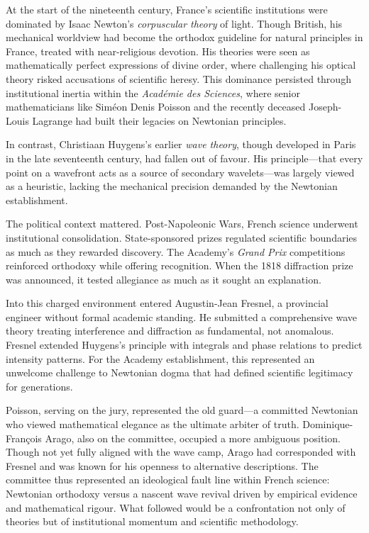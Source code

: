 \begin{historical}
At the start of the nineteenth century, France’s scientific institutions were dominated by Isaac Newton’s \emph{corpuscular theory} of light. Though British, his mechanical worldview had become the orthodox guideline for natural principles in France, treated with near-religious devotion. His theories were seen as mathematically perfect expressions of divine order, where challenging his optical theory risked accusations of scientific heresy. This dominance persisted through institutional inertia within the \emph{Académie des Sciences}, where senior mathematicians like Siméon Denis Poisson and the recently deceased Joseph-Louis Lagrange had built their legacies on Newtonian principles.

In contrast, Christiaan Huygens’s earlier \emph{wave theory}, though developed in Paris in the late seventeenth century, had fallen out of favour. His principle—that every point on a wavefront acts as a source of secondary wavelets—was largely viewed as a heuristic, lacking the mechanical precision demanded by the Newtonian establishment.

The political context mattered. Post-Napoleonic Wars, French science underwent institutional consolidation. State-sponsored prizes regulated scientific boundaries as much as they rewarded discovery. The Academy's \emph{Grand Prix} competitions reinforced orthodoxy while offering recognition. When the 1818 diffraction prize was announced, it tested allegiance as much as it sought an explanation.

Into this charged environment entered Augustin-Jean Fresnel, a provincial engineer without formal academic standing. He submitted a comprehensive wave theory treating interference and diffraction as fundamental, not anomalous. Fresnel extended Huygens’s principle with integrals and phase relations to predict intensity patterns. For the Academy establishment, this represented an unwelcome challenge to Newtonian dogma that had defined scientific legitimacy for generations.

Poisson, serving on the jury, represented the old guard—a committed Newtonian who viewed mathematical elegance as the ultimate arbiter of truth. Dominique-François Arago, also on the committee, occupied a more ambiguous position. Though not yet fully aligned with the wave camp, Arago had corresponded with Fresnel and was known for his openness to alternative descriptions. The committee thus represented an ideological fault line within French science: Newtonian orthodoxy versus a nascent wave revival driven by empirical evidence and mathematical rigour. What followed would be a confrontation not only of theories but of institutional momentum and scientific methodology.
\end{historical}
